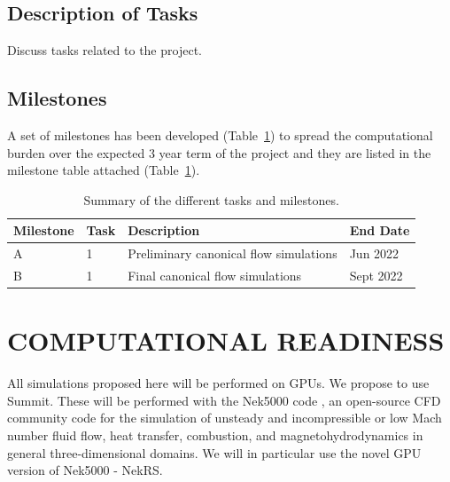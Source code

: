 \documentclass[11pt,letterpaper,english]{article}
\begin{document}
\vspace{-.25in}
\subsection{Description of Tasks}
\vspace{-.2in}

Discuss tasks related to the project.



\vspace{-.25in}
\subsection{Milestones}
\vspace{-.2in}

A set of milestones has been developed (Table~\ref{tab:milestones}) to spread the computational burden over
the expected 3 year term of the project and they are listed in the milestone table attached (Table~\ref{tab:milestones}).

\begin{table}
\centering
\caption{Summary of the different tasks and milestones.}
\begin{tabular}{llll}
\hline
\hline
Milestone & Task & Description & End Date \\
\hline
\hline
A & 1 & Preliminary canonical flow simulations   & Jun  2022 \\
B & 1 & Final canonical flow simulations         & Sept 2022 \\
\hline
\hline
\end{tabular}
\label{tab:milestones}
\end{table}

\vspace{-.25in}
\section{COMPUTATIONAL READINESS}
\vspace{-.2in}

All simulations proposed here will be performed on GPUs. We propose to use
Summit.  These will be performed with the Nek5000 code
\cite{argonne:nekdoc}, an open-source CFD  community code for the simulation of
unsteady and incompressible or low Mach number fluid flow, heat transfer,
combustion, and magnetohydrodynamics in general three-dimensional domains. We
will in particular use the novel GPU version of Nek5000 - NekRS.
\end{document}
